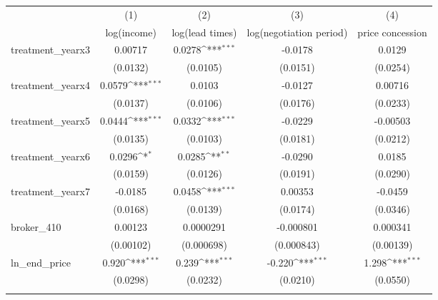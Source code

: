 {
\def\sym#1{\ifmmode^{#1}\else\(^{#1}\)\fi}
\begin{tabular}{l*{4}{c}}
\toprule
            &\multicolumn{1}{c}{(1)}&\multicolumn{1}{c}{(2)}&\multicolumn{1}{c}{(3)}&\multicolumn{1}{c}{(4)}\\
            &\multicolumn{1}{c}{log(income)}&\multicolumn{1}{c}{log(lead times)}&\multicolumn{1}{c}{log(negotiation period)}&\multicolumn{1}{c}{price concession}\\
\midrule
treatment\_yearx3&     0.00717         &      0.0278\sym{***}&     -0.0178         &      0.0129         \\
            &    (0.0132)         &    (0.0105)         &    (0.0151)         &    (0.0254)         \\
\addlinespace
treatment\_yearx4&      0.0579\sym{***}&      0.0103         &     -0.0127         &     0.00716         \\
            &    (0.0137)         &    (0.0106)         &    (0.0176)         &    (0.0233)         \\
\addlinespace
treatment\_yearx5&      0.0444\sym{***}&      0.0332\sym{***}&     -0.0229         &    -0.00503         \\
            &    (0.0135)         &    (0.0103)         &    (0.0181)         &    (0.0212)         \\
\addlinespace
treatment\_yearx6&      0.0296\sym{*}  &      0.0285\sym{**} &     -0.0290         &      0.0185         \\
            &    (0.0159)         &    (0.0126)         &    (0.0191)         &    (0.0290)         \\
\addlinespace
treatment\_yearx7&     -0.0185         &      0.0458\sym{***}&     0.00353         &     -0.0459         \\
            &    (0.0168)         &    (0.0139)         &    (0.0174)         &    (0.0346)         \\
\addlinespace
broker\_410  &     0.00123         &   0.0000291         &   -0.000801         &    0.000341         \\
            &   (0.00102)         &  (0.000698)         &  (0.000843)         &   (0.00139)         \\
\addlinespace
ln\_end\_price&       0.920\sym{***}&       0.239\sym{***}&      -0.220\sym{***}&       1.298\sym{***}\\
            &    (0.0298)         &    (0.0232)         &    (0.0210)         &    (0.0550)         \\
\addlinespace

\end{tabular}}
